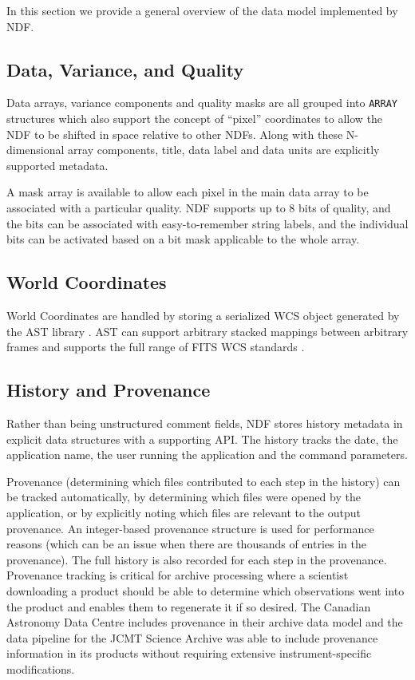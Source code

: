 \documentclass[11pt,twoside]{article}
\begin{document}
In this section we provide a general overview of the data model
implemented by NDF.

\subsection{Data, Variance, and Quality}

Data arrays, variance components and quality masks are all grouped
into \texttt{ARRAY} structures which also support the concept of
``pixel'' coordinates to allow the NDF to be shifted in space relative
to other NDFs. Along with these N-dimensional array components, title,
data label and data units are explicitly supported metadata.

A mask array is available to allow each pixel in the main data array
to be associated with a particular quality. NDF supports up to 8 bits
of quality, and the bits can be associated with easy-to-remember
string labels, and the individual bits can be activated based on a bit
mask applicable to the whole array.

\subsection{World Coordinates}

World Coordinates are handled by storing a serialized WCS object
generated by the AST library \citep{1998ASPC..145...41W}. AST can
support arbitrary stacked mappings between arbitrary frames and
supports the full range of FITS WCS standards \citep[see
e.g.][]{2012ASPC..461..825B}.

\subsection{History and Provenance}

Rather than being unstructured comment fields, NDF stores history
metadata in explicit data structures with a supporting API. The
history tracks the date, the application name, the user running the
application and the command parameters.

Provenance (determining which files contributed to each step in the
history) can be tracked automatically, by determining which files were
opened by the application, or by explicitly noting which files are
relevant to the output provenance. An integer-based provenance
structure is used for performance reasons (which can be an issue when
there are thousands of entries in the provenance). The full history is
also recorded for each step in the provenance. Provenance tracking is
critical for archive processing where a scientist downloading a
product should be able to determine which observations went into the
product and enables them to regenerate it if so desired. The Canadian
Astronomy Data Centre includes provenance in their archive data model
\citep[CAOM;][]{P25_adassxxii} and the data pipeline for the JCMT
Science Archive \citep{2008ASPC..394..565J} was able to include
provenance information in its products without requiring extensive
instrument-specific modifications.
\end{document}

